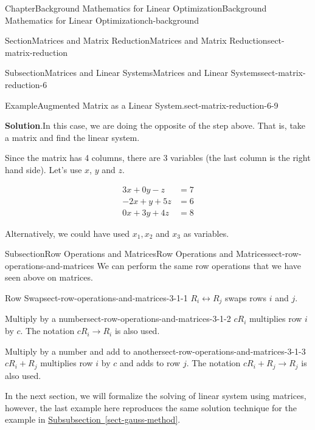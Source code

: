 \documentclass[oneside,10pt,]{book}
\newcommand{\blocktitlefont}{\relax}
\newcommand{\xreffont}{\relax}
\numberwithin{equation}{section}
\newcommand{\amp}{&}
\begin{document}
\begin{chapterptx}{Chapter}{Background Mathematics for Linear Optimization}{}{Background Mathematics for Linear Optimization}{}{}{ch-background}
\begin{sectionptx}{Section}{Matrices and Matrix Reduction}{}{Matrices and Matrix Reduction}{}{}{sect-matrix-reduction}
\begin{subsectionptx}{Subsection}{Matrices and Linear Systems}{}{Matrices and Linear Systems}{}{}{sect-matrix-reduction-6}
\begin{example}{Example}{Augmented Matrix as a Linear System.}{sect-matrix-reduction-6-9}
\begin{equation*}
\end{equation*}
%
\par\smallskip%
\noindent\textbf{\blocktitlefont Solution}.\hypertarget{sect-matrix-reduction-6-9-3}{}\quad{}In this case, we are doing the opposite of the step above. That is, take a matrix and find the linear system.%
\par
Since the matrix has 4 columns, there are 3 variables (the last column is the right hand side). Let's use \(x\), \(y\) and \(z\).%
\par
%
\begin{align*}
3x + 0 y - z \amp = 7 \\
-2x + y + 5z \amp = 6 \\
0x + 3y + 4 z \amp = 8
\end{align*}
%
\par
Alternatively, we could have used \(x_1,x_2\) and \(x_3\) as variables.%
\end{example}
\end{subsectionptx}
%
%
\typeout{************************************************}
\typeout{************************************************}
%
\begin{subsectionptx}{Subsection}{Row Operations and Matrices}{}{Row Operations and Matrices}{}{}{sect-row-operations-and-matrices}
We can perform the same row operations that we have seen above on matrices.%
\par
%
\begin{descriptionlist}
\begin{dlimedium}{Row Swap}{sect-row-operations-and-matrices-3-1-1}%
\(R_i \leftrightarrow R_j\) swaps rows \(i\) and \(j\).%
\end{dlimedium}%
\begin{dlimedium}{Multiply by a number}{sect-row-operations-and-matrices-3-1-2}%
\(c R_i\) multiplies row \(i\) by \(c\). The notation \(c R_i \to R_i\) is also used.%
\end{dlimedium}%
\begin{dlimedium}{Multiply by a number and add to another}{sect-row-operations-and-matrices-3-1-3}%
\(cR_i + R_j\) multiplies row \(i\) by \(c\) and adds to row \(j\). The notation \(cR_i + R_j \to R_j\) is also used.%
\end{dlimedium}%
\end{descriptionlist}
%
\par
In the next section, we will formalize the solving of linear system using matrices, however, the last example here reproduces the same solution technique for the example in \hyperref[sect-gauss-method]{Subsubsection~{\xreffont\ref{sect-gauss-method}}}.%

\end{subsectionptx}
\end{sectionptx}
\end{chapterptx}
\end{document}
